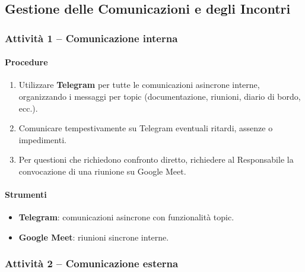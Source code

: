 \documentclass[a4paper, 11pt, oneside]{scrartcl}
\begin{document}
\subsection{Gestione delle Comunicazioni e degli Incontri}

\subsubsection{Attività 1 – Comunicazione interna}

\paragraph{Procedure}
\begin{enumerate}
    \item Utilizzare \textbf{Telegram} per tutte le comunicazioni asincrone interne, organizzando i messaggi per topic (documentazione, riunioni, diario di bordo, ecc.).
    \item Comunicare tempestivamente su Telegram eventuali ritardi, assenze o impedimenti.
    \item Per questioni che richiedono confronto diretto, richiedere al Responsabile la convocazione di una riunione su Google Meet.
\end{enumerate}

\paragraph{Strumenti}
\begin{itemize}
    \item \textbf{Telegram}: comunicazioni asincrone con funzionalità topic.
    \item \textbf{Google Meet}: riunioni sincrone interne.
\end{itemize}

\subsubsection{Attività 2 – Comunicazione esterna}
\end{document}
